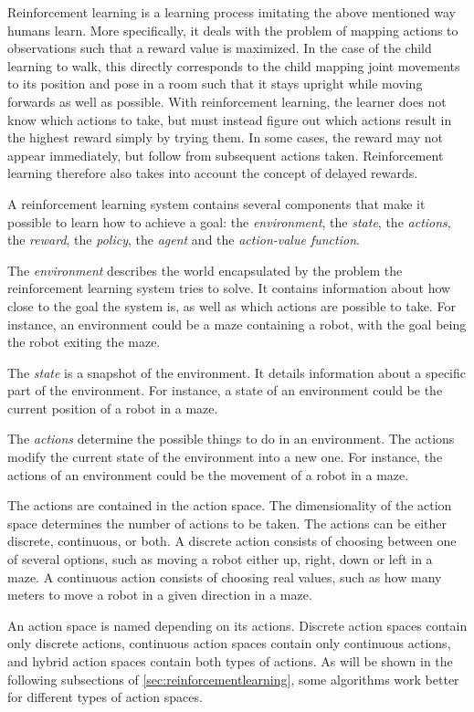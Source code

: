 \documentclass{kththesis}
\begin{document}
Reinforcement learning is a learning process imitating the above mentioned way humans learn. More specifically, it deals with the problem of mapping actions to observations such that a reward value is maximized. In the case of the child learning to walk, this directly corresponds to the child mapping joint movements to its position and pose in a room such that it stays upright while moving forwards as well as possible. With reinforcement learning, the learner does not know which actions to take, but must instead figure out which actions result in the highest reward simply by trying them. In some cases, the reward may not appear immediately, but follow from subsequent actions taken. Reinforcement learning therefore also takes into account the concept of delayed rewards. \parencite{sutton1998introduction}

A reinforcement learning system contains several components that make it possible to learn how to achieve a goal: the \textit{environment}, the \textit{state}, the \textit{actions}, the \textit{reward}, the \textit{policy}, the \textit{agent} and the \textit{action-value function}.

The \textit{environment} describes the world encapsulated by the problem the reinforcement learning system tries to solve. It contains information about how close to the goal the system is, as well as which actions are possible to take. For instance, an environment could be a maze containing a robot, with the goal being the robot exiting the maze.

The \textit{state} is a snapshot of the environment. It details information about a specific part of the environment. For instance, a state of an environment could be the current position of a robot in a maze.

The \textit{actions} determine the possible things to do in an environment. The actions modify the current state of the environment into a new one. For instance, the actions of an environment could be the movement of a robot in a maze. 

The actions are contained in the action space. The dimensionality of the action space determines the number of actions to be taken. The actions can be either discrete, continuous, or both. A discrete action consists of choosing between one of several options, such as moving a robot either up, right, down or left in a maze. A continuous action consists of choosing real values, such as how many meters to move a robot in a given direction in a maze.

An action space is named depending on its actions. Discrete action spaces contain only discrete actions, continuous action spaces contain only continuous actions, and hybrid action spaces contain both types of actions. As will be shown in the following subsections of \autoref{sec:reinforcementlearning}, some algorithms work better for different types of action spaces.
\end{document}
